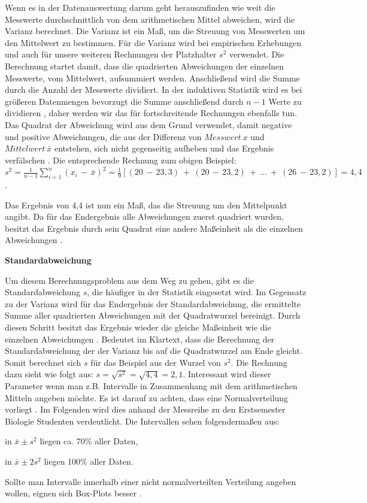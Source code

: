 Wenn es in der Datenauswertung darum geht herauszufinden wie weit die Messwerte durchschnittlich von dem arithmetischen Mittel abweichen, wird die Varianz berechnet. Die Varianz ist ein Maß, um die Streuung von Messwerten um den Mittelwert zu bestimmen. Für die Varianz wird bei empirischen Erhebungen und auch für unsere weiteren Rechnungen der Platzhalter $s^2$ verwendet. Die Berechnung startet damit, dass die quadrierten Abweichungen der einzelnen Messwerte, vom Mittelwert, aufsummiert werden. Anschließend wird die Summe durch die Anzahl der Messwerte dividiert. In der induktiven Statistik wird es bei größeren Datenmengen bevorzugt die Summe anschließend durch $n-1$ Werte zu dividieren \citep[vgl.][65]{Fahrmeir2016}, daher werden wir das für fortschreitende Rechnungen ebenfalls tun. Das Quadrat der Abweichung wird aus dem Grund verwendet, damit negative und positive Abweichungen, die aus der Differenz von $Messwert\:x$ und $Mittelwert\:\bar{x} $ entstehen, sich nicht gegenseitig aufheben und das Ergebnis verfälschen \citep[vgl.][65]{Fahrmeir2016}. Die entsprechende Rechnung zum obigen Beispiel: \\
$s^2 = \frac{1}{n - 1} \sum \limits_{i=1}^n (x_i\,-\,\bar{x})^2 = \frac{1}{9}[ (20\,-\,23,3)\:+\:(20\,-\,23,2)\:+\:...\:+\:(26\,-\,23,2)]= 4,4$. 

Das Ergebnis von 4,4 ist nun ein Maß, das die Streuung um den Mittelpunkt angibt. Da für das Endergebnis alle Abweichungen zuerst quadriert wurden, besitzt das Ergebnis durch sein Quadrat eine andere Maßeinheit als die einzelnen Abweichungen \citep[vgl.][65]{Fahrmeir2016}.

\textbf{Standardabweichung}

Um diesem Berechnungsproblem aus dem Weg zu gehen, gibt es die Standardabweichung $s$, die häufiger in der Statistik eingesetzt wird. Im Gegensatz zu der Varianz wird für das Endergebnis der Standardabweichung, die ermittelte Summe aller quadrierten Abweichungen mit der Quadratwurzel bereinigt. Durch diesen Schritt besitzt das Ergebnis wieder die gleiche Maßeinheit wie die einzelnen Abweichungen \citep[vgl.][65]{Fahrmeir2016}. Bedeutet im Klartext, dass die Berechnung der Standardabweichung der der Varianz bis auf die Quadratwurzel am Ende gleicht. Somit berechnet sich $s$ für das Beispiel aus der Wurzel von $s^2$. Die Rechnung dazu sieht wie folgt aus: $s = \sqrt{s^2} = \sqrt{4,4} = 2,1$. Interessant wird dieser Parameter wenn man z.B. Intervalle in Zusammenhang mit dem arithmetischen Mitteln angeben möchte. Es ist darauf zu achten, dass eine Normalverteilung vorliegt \citep[vgl.][67]{Fahrmeir2016}. Im Folgenden wird dies anhand der Messreihe zu den Erstsemester Biologie Studenten verdeutlicht. Die Intervallen sehen folgendermaßen aus:
\begin{compactitem}
    \item in $\bar{x} \pm s^2$ liegen ca. 70\% aller Daten,
    \item in $\bar{x} \pm 2s^2$ liegen 100\% aller Daten. 
\end{compactitem}
Sollte man Intervalle innerhalb einer nicht normalverteilten Verteilung angeben wollen, eignen sich Box-Plots besser \citep[vgl.][67]{Fahrmeir2016}.



